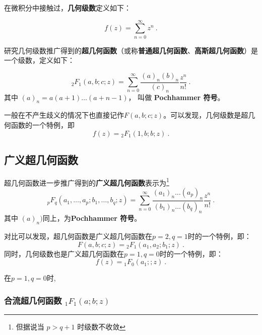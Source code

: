

在微积分中接触过，\textbf{几何级数}定义如下：

\begin{equation}
f(z) = \sum_{n=0}^\infty z^n~.
\end{equation}

研究几何级数推广得到的\textbf{超几何函数}（或称\textbf{普通超几何函数}、\textbf{高斯超几何函数}）是一个级数，定义如下：

\begin{equation}
{_2F_1}(a,b;c;z) = \sum_{n=0}^\infty \frac{(a)_n(b)_n}{(c)_n} \frac{z^n}{n!}~.
\end{equation}
其中 $(a)_n = a(a+1)\dots(a+n-1)$， 叫做 \textbf{Pochhammer 符号}。

一般在不产生歧义的情况下也直接记作$F(a,b;c;z)$。可以发现，几何级数是超几何函数的一个特例，即
\begin{equation}
f(z)={_2F_1}(1,b;b;z)~.
\end{equation}

\subsection{广义超几何函数}

超几何函数进一步推广得到的\textbf{广义超几何函数}表示为\footnote{但据说当 $p > q+1$ 时级数不收敛}
\begin{equation}
{_pF_q}(a_1,\dots, a_p; b_1, \dots, b_q; z) = \sum_{n=0}^\infty \frac{(a_1)_n\dots (a_p)_n}{(b_1)_n\dots(b_q)_n} \frac{z^n}{n!}~.
\end{equation}
其中 $(a)_n)$同上，为\textbf{Pochhammer 符号}。

对比可以发现，超几何函数是广义超几何函数在$p=2,q=1$时的一个特例，即：
\begin{equation}
F(a,b;c;z)={_2F_1}(a_1,a_2; b_1; z)~.
\end{equation}
同时，几何级数也是广义超几何函数在$p=1,q=0$时的一个特例，即：
\begin{equation}
f(z)={_1F_0}(a_1;; z)~.
\end{equation}

在$p=1,q=0$时,
\subsubsection{合流超几何函数 $_1F_1(a; b; z)$}

